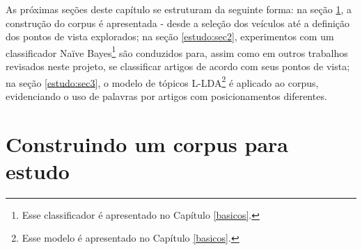 
As próximas seções deste capítulo se estruturam da seguinte forma: na seção \ref{estudo:sec1}, a construção do corpus é apresentada - desde a seleção dos veículos até a definição dos pontos de vista explorados; na seção \ref{estudo:sec2}, experimentos com um classificador Naïve Bayes\footnote{Esse classificador é apresentado no Capítulo \ref{basicos}.} são conduzidos para, assim como em outros trabalhos revisados neste projeto, se classificar artigos de acordo com seus pontos de vista; na seção \ref{estudo:sec3}, o modelo de tópicos L-LDA\footnote{Esse modelo é apresentado no Capítulo \ref{basicos}.} é aplicado ao corpus, evidenciando o uso de palavras por artigos com posicionamentos diferentes. 


\section{Construindo um corpus para estudo}
\label{estudo:sec1}


